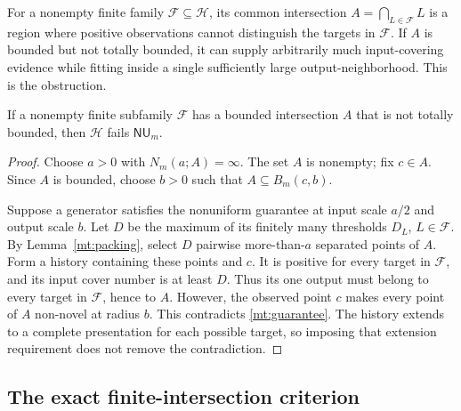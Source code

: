 For a nonempty finite family $\mathcal F\subseteq\mathcal H$, its common
intersection $A=\bigcap_{L\in\mathcal F}L$ is a region where positive
observations cannot distinguish the targets in $\mathcal F$.
If $A$ is bounded but not totally bounded, it can supply arbitrarily much
input-covering evidence while fitting inside a single sufficiently large
output-neighborhood. This is the obstruction.

\begin{lemma}
\label{mt:obstruction}
If a nonempty finite subfamily $\mathcal F$ has a bounded intersection
$A$ that is not totally bounded, then $\mathcal H$ fails
$\mathsf{NU}_m$.
\end{lemma}
\begin{proof}
Choose $a>0$ with $N_m(a;A)=\infty$. The set $A$ is nonempty; fix
$c\in A$. Since $A$ is bounded, choose $b>0$ such that
$A\subseteq B_m(c,b)$.

Suppose a generator satisfies the nonuniform guarantee at input scale
$a/2$ and output scale $b$. Let $D$ be the maximum of its finitely many
thresholds $D_L$, $L\in\mathcal F$. By Lemma~\ref{mt:packing}, select
$D$ pairwise more-than-$a$ separated points of $A$. Form a history
containing these points and $c$. It is positive for every target in
$\mathcal F$, and its input cover number is at least $D$. Thus its one
output must belong to every target in $\mathcal F$, hence to $A$.
However, the observed point $c$ makes every point of $A$ non-novel at
radius $b$. This contradicts \eqref{mt:guarantee}.
The history extends to a complete presentation for each possible target,
so imposing that extension requirement does not remove the contradiction.
\end{proof}

\subsection{The exact finite-intersection criterion}

